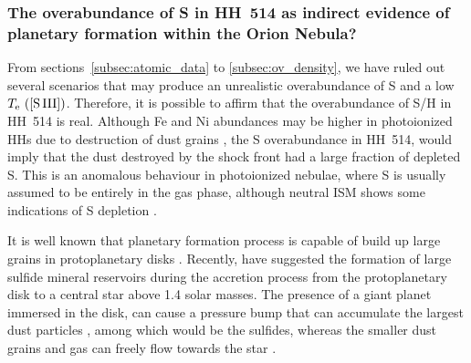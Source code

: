 \documentclass[fleqn,usenatbib]{mnras}
\newcommand{\eduardo}[1]{{\color{teal}E: #1}}
\newcommand{\jorge}[1]{{\color{magenta}J: #1}}
\begin{document}




\subsubsection{The overabundance of S in HH~514 as indirect evidence of planetary formation within the Orion Nebula?}
\label{subsec:real_overabundance}

From sections~\ref{subsec:atomic_data} to \ref{subsec:ov_density}, we have ruled out several scenarios that may produce an unrealistic overabundance of S and a low $T_{\rm e} \text{ ([S\thinspace III])}$. Therefore, it is possible to affirm that the overabundance of S/H in HH~514 is real. Although Fe and Ni abundances may be higher in photoionized HHs  due to destruction of dust grains \citep[][]{Blagrave06, mesadelgado09, mendez2021, mendez2021-2}, the S overabundance in HH~514, would imply that the dust destroyed by the shock front had a large fraction of depleted S. This is an anomalous behaviour in photoionized nebulae, where S is usually assumed to be entirely in the gas phase, although neutral ISM shows some indications of S depletion \citep[][]{Jenkins09}.

It is well known that planetary formation process is capable of build up large grains in protoplanetary disks \citep[][]{Beckwith2000}. Recently, \citet{Kama19} have suggested the formation of large sulfide mineral reservoirs during the accretion process from the protoplanetary disk to a central star above 1.4 solar masses. The presence of a giant planet immersed in the disk, can cause a pressure bump that can accumulate the largest dust particles \citep{Pinilla2012,Birnstiel16}, among which would be the sulfides, whereas the smaller dust grains and gas can freely flow towards the star \citep[][]{Kama19}.
\end{document}
